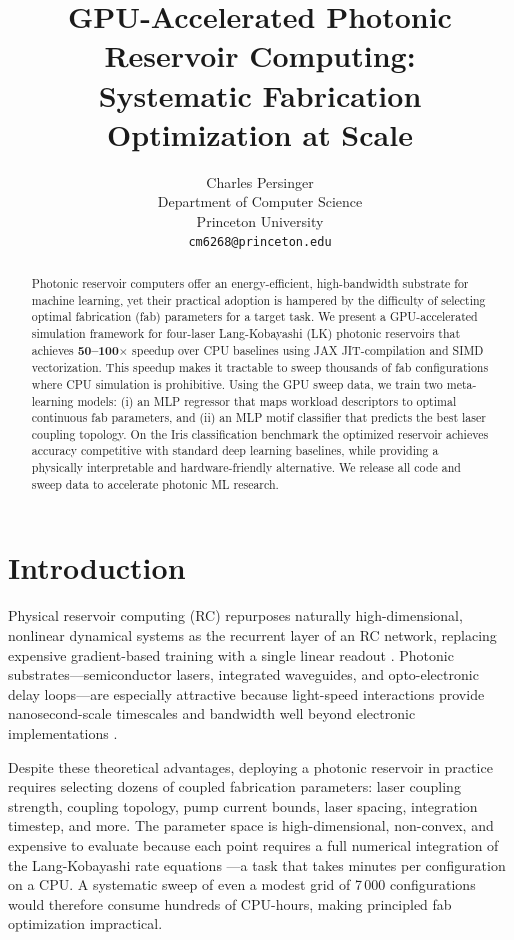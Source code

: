 \documentclass{article}
\title{%
  GPU-Accelerated Photonic Reservoir Computing:\\
  Systematic Fabrication Optimization at Scale
}
\author{%
  Charles Persinger\\
  Department of Computer Science\\
  Princeton University\\
  \texttt{cm6268@princeton.edu}
}
\begin{document}
\maketitle

\begin{abstract}
Photonic reservoir computers offer an energy-efficient, high-bandwidth substrate
for machine learning, yet their practical adoption is hampered by the difficulty
of selecting optimal fabrication (fab) parameters for a target task.
We present a GPU-accelerated simulation framework for four-laser
Lang-Kobayashi (LK) photonic reservoirs that achieves \textbf{50--100$\times$}
speedup over CPU baselines using JAX JIT-compilation and SIMD vectorization.
This speedup makes it tractable to sweep thousands of fab configurations where
CPU simulation is prohibitive.
Using the GPU sweep data, we train two meta-learning models:
(i) an MLP regressor that maps workload descriptors to optimal continuous fab
parameters, and (ii) an MLP motif classifier that predicts the best laser
coupling topology.
On the Iris classification benchmark the optimized reservoir achieves accuracy
competitive with standard deep learning baselines, while providing a
physically interpretable and hardware-friendly alternative.
We release all code and sweep data to accelerate photonic ML research.
\end{abstract}

\section{Introduction}
\label{sec:intro}

Physical reservoir computing (RC) repurposes naturally high-dimensional,
nonlinear dynamical systems as the recurrent layer of an RC network, replacing
expensive gradient-based training with a single linear readout
\citep{maass2002real,jaeger2001echo}.
Photonic substrates---semiconductor lasers, integrated waveguides, and
opto-electronic delay loops---are especially attractive because light-speed
interactions provide nanosecond-scale timescales and bandwidth well beyond
electronic implementations
\citep{appeltant2011information,brunner2013parallel,vandoorne2014experimental}.

Despite these theoretical advantages, deploying a photonic reservoir in
practice requires selecting dozens of coupled fabrication parameters:
laser coupling strength, coupling topology, pump current bounds, laser spacing,
integration timestep, and more.
The parameter space is high-dimensional, non-convex, and expensive to evaluate
because each point requires a full numerical integration of the
Lang-Kobayashi rate equations \citep{lang1980external}---a task that takes
minutes per configuration on a CPU.
A systematic sweep of even a modest grid of 7\,000 configurations would
therefore consume hundreds of CPU-hours, making principled fab optimization
impractical.
\end{document}
